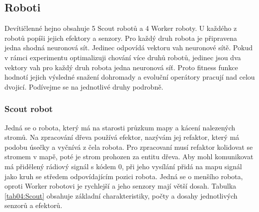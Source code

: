 \subsection*{Roboti}
Devítičlenné hejno obsahuje 5 Scout robotů a 4 Worker roboty. U každého z robotů popíši jejich efektory a senzory. Pro každý druh robota je připravena jedna shodná neuronová sít. Jedinec odpovídá vektoru vah neuronové sítě. Pokud v rámci experimentu optimalizuji chování více druhů robotů, jedinec jsou dva vektory vah pro každý druh robota jedna neuronová síť. Proto fitness funkce hodnotí jejich výsledné snažení dohromady a evoluční operátory pracují nad celou dvojicí. Podívejme se na jednotlivé druhy podrobně.
\subsubsection{Scout robot}
Jedná se o robota, který má na starosti průzkum mapy a kácení nalezených stromů. Na zpracování dřeva používá efektor, nazývám jej refaktor, který má podobu úsečky a vyčnívá z čela robota. Pro zpracovaní musí refaktor kolidovat se stromem v mapě, poté je strom prohozen za entitu dřeva. Aby mohl komunikovat má přidělený rádiový signál s kódem 0, při jeho vysílání přidá na mapu signál jako kruh se středem odpovídajícím pozici robota. Jedná se o menšího robota, oproti Worker robotovi je rychlejší a jeho senzory mají větší dosah. Tabulka \ref{tab04:Scout} obsahuje základní charakteristiky, počty a dosahy jednotlivých senzorů a efektorů.
\par 
